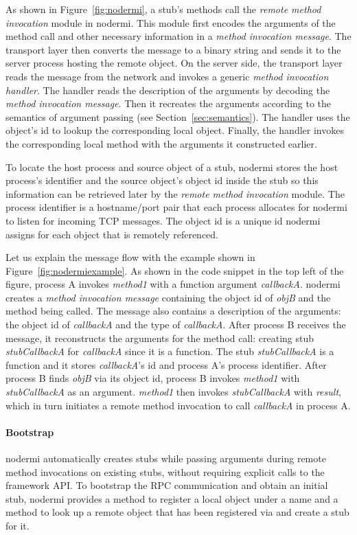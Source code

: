 \nodermifig{}

As shown in Figure~\ref{fig:nodermi}, a stub's methods call the
\emph{remote method invocation} module in nodermi.
This module first encodes the arguments of the method call
 and other necessary information
in a \emph{method invocation message}.
The transport layer then converts the message to
a binary string and sends it
to the server process hosting the remote object.
On the server side, the transport layer reads
the message from the network and invokes a generic
\emph{method invocation handler}.
The handler reads the description of the arguments
by decoding the \emph{method invocation message}.
Then it recreates the arguments according to
the semantics of argument passing (see Section~\ref{sec:semantics}).
The handler uses the object's id to lookup the corresponding local object.
Finally, the handler invokes the corresponding local method
with the arguments it constructed earlier.

To locate the host process and source object of a stub,
nodermi stores the host process's identifier and the source object's object id
inside the stub so this information can be retrieved later by
the \emph{remote method invocation} module.
The process identifier is a hostname/port pair that each process
allocates for nodermi to listen for incoming TCP messages.
The object id is a unique id nodermi assigns for each object that
is remotely referenced.

Let us explain the message flow with the example shown in Figure~\ref{fig:nodermiexample}.
As shown in the code snippet in the top left of the figure,
process A invokes \emph{method1} with a function argument \emph{callbackA}.
nodermi creates a \emph{method invocation message}
containing the object id of \emph{objB} and the method being called.
The message also contains a description of the arguments:
the object id of \emph{callbackA} and
the type of \emph{callbackA}.
After process B receives the message,
it reconstructs the arguments for the method call:
creating stub \emph{stubCallbackA} for \emph{callbackA} since it is a function.
The stub \emph{stubCallbackA} is a function and
it stores \emph{callbackA}'s id and process A's process identifier.
After process B finds \emph{objB} via its object id,
process B invokes \emph{method1} with \emph{stubCallbackA} as an argument.
\emph{method1} then invokes \emph{stubCallbackA} with \emph{result},
which in turn initiates a remote method invocation
to call \emph{callbackA} in process A.


\paragraph{Bootstrap}
nodermi automatically creates stubs while passing arguments during remote method invocations
on existing stubs, without requiring explicit calls to the framework API.
To bootstrap the RPC communication and obtain an initial stub,
nodermi provides a  method to register a local object
under a name and a  method to look up a remote object that
has been registered via  and create a stub for it.

